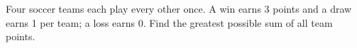 Four soccer teams each play every other once. A win earns 3 points and a draw earns 1 per team; a loss earns 0. Find the greatest possible sum of all team points.
